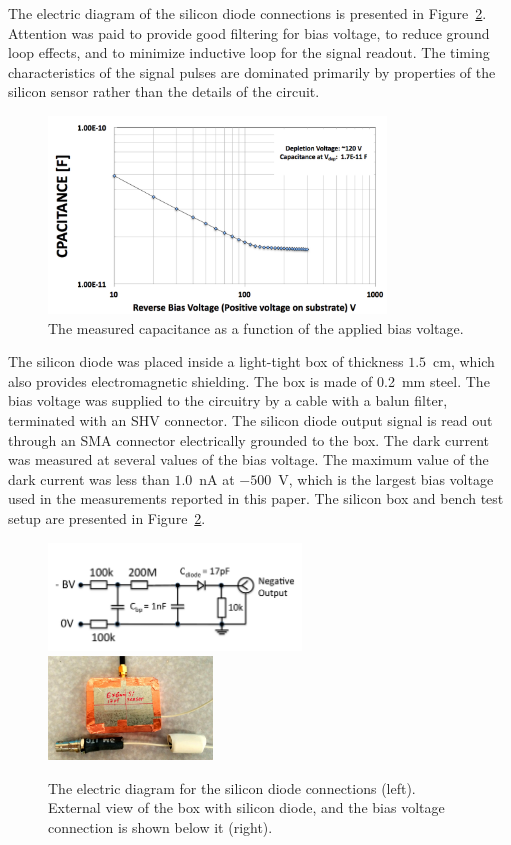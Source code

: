 \documentclass[preprint,1p]{elsarticle}
\begin{document}
The electric diagram of the silicon
diode connections is presented in Figure~\ref{fig:SiliconPad}. Attention was
paid to provide good filtering for bias voltage, to reduce ground loop effects, and
to minimize inductive loop for the signal readout. The timing characteristics
of the signal pulses are dominated primarily by properties of the
silicon sensor rather than the details of the circuit.

\begin{figure}[htbp] 
\centering
\includegraphics[width=0.8\textwidth]{plots/SiliconDiodeCV_v2.png} 
\caption{The measured capacitance as a function of the applied bias voltage.} 
\label{fig:SiliconDiode} 
\end{figure} 

The silicon diode was placed inside a light-tight box of thickness $1.5$~cm,
which also provides electromagnetic shielding. The box is made of 0.2~mm steel.
The bias voltage was supplied to the circuitry by a cable with a balun filter,
terminated with an SHV connector. The silicon diode output signal is read out
through an SMA connector electrically grounded to the box. The dark current was
measured at several values of the bias voltage. The maximum value of the dark
current was less than $1.0$~nA at $-500$~V, which is the largest bias voltage
used in the measurements reported in this paper. The silicon box and bench test
setup are presented in Figure~\ref{fig:SiliconPad}. 

\begin{figure}[htbp] 
\centering
\includegraphics[width=0.60\textwidth]{plots/SiliconDiodeDiagram.pdf} 
\includegraphics[width=0.39\textwidth]{plots/SiliconDiodeBox.jpg} 
\caption{The electric diagram for the silicon diode connections (left). External
view of the box with silicon diode, and the bias voltage connection is shown
below it (right).} 
\label{fig:SiliconPad} 
\end{figure} 
\end{document}
